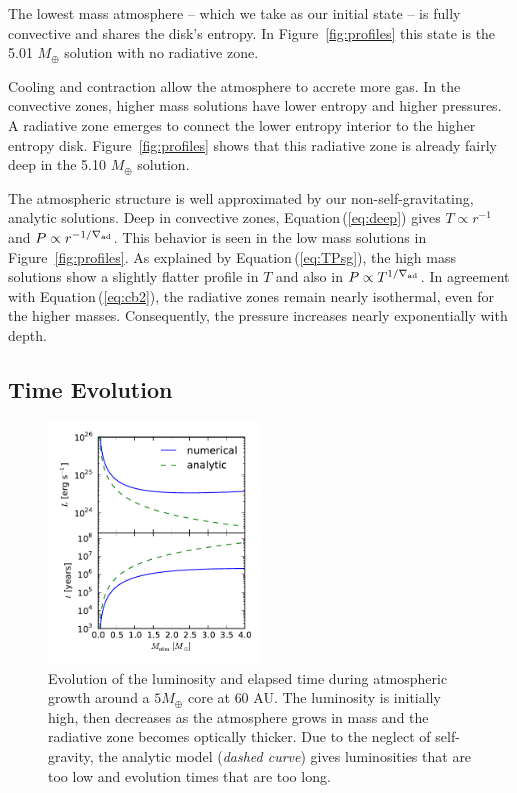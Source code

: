 \documentclass[apj, numberedappendix]{emulateapj}
\newcommand{\Eq}[1]{Equation\,(\ref{#1})}
\newcommand{\Fig}[1]{Figure~\ref{#1}}
\newcommand{\delad}{\nabla_{\rm ad}}
\begin{document}
The lowest mass atmosphere -- which we take as our initial state -- is fully convective and shares the disk's entropy.  In \Fig{fig:profiles} this state is the 5.01 $M_{\oplus}$ solution with no radiative zone.

Cooling and contraction allow the atmosphere to accrete more gas.  In the convective zones, higher mass solutions have lower entropy and higher pressures.  A radiative zone emerges to connect the lower entropy interior to the higher entropy disk.  \Fig{fig:profiles} shows that this radiative zone is already fairly deep in the 5.10 $M_\oplus$ solution. 
 
The atmospheric structure is well approximated by our non-self-gravitating, analytic solutions.  Deep in convective zones, \Eq{eq:deep} gives $T \propto r^{-1}$ and $P\propto r^{-1/\delad}$.  This behavior is seen in the low mass solutions in \Fig{fig:profiles}.  As explained by \Eq{eq:TPsg}, the high mass solutions show a slightly flatter profile in $T$ and also in $P \propto T^{1/\delad}$.  In agreement with \Eq{eq:cb2}, the radiative zones remain nearly isothermal, even for the higher masses.  Consequently, the pressure increases nearly exponentially with depth.  


\subsection{Time Evolution}\label{sec:timeev}

\begin{figure}[tb]
\centering
\includegraphics[width=0.5\textwidth]{../../figs/ModelAtmospheres/RadSelfGravPoly/PaperFigs/Lt_profiles_v2.pdf}
\caption{Evolution of the luminosity and elapsed time during atmospheric growth around a $5 M_{\oplus}$ core at $60$ AU.  The luminosity is initially high, then decreases as the atmosphere grows in mass and the radiative zone becomes optically thicker.  Due to the neglect of self-gravity, the analytic model (\emph{dashed curve}) gives luminosities that are too low and evolution times that are too long.}
\label{fig:Ltplot}
\end{figure}
\end{document}
